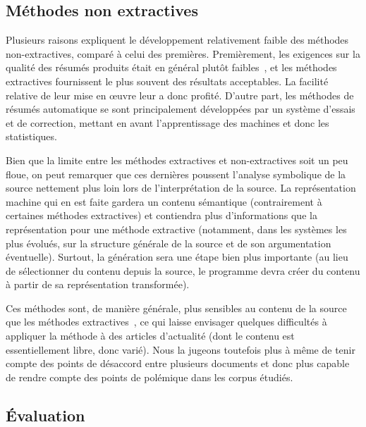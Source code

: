 \documentclass{article}           %
\begin{document}
\subsection{Méthodes non extractives}

Plusieurs raisons expliquent le développement relativement faible des méthodes non-extractives, comparé à celui des premières. Premièrement, les exigences sur la qualité des résumés produits était en général plutôt faibles~\cite{jones_automatic_2007}, et les méthodes extractives fournissent le plus souvent des résultats acceptables. La facilité relative de leur mise en œuvre leur a donc profité. D'autre part, les méthodes de résumés automatique se sont principalement développées par un système d'essais et de correction, mettant en avant l'apprentissage des machines et donc les statistiques.

Bien que la limite entre les méthodes extractives et non-extractives soit un peu floue, on peut remarquer que ces dernières poussent l'analyse symbolique de la source nettement plus loin lors de l'interprétation de la source. La représentation machine qui en est faite gardera un contenu sémantique (contrairement à certaines méthodes extractives) et contiendra plus d'informations que la représentation pour une méthode extractive (notamment, dans les systèmes les plus évolués, sur la structure générale de la source et de son argumentation éventuelle). Surtout, la génération sera une étape bien plus importante (au lieu de sélectionner du contenu depuis la source, le programme devra créer du contenu à partir de sa représentation transformée).

Ces méthodes sont, de manière générale, plus sensibles au contenu de la source que les méthodes extractives~\cite[p.1774]{jones_automatic_2007}, ce qui laisse envisager quelques difficultés à appliquer la méthode à des articles d'actualité (dont le contenu est essentiellement libre, donc varié). Nous la jugeons toutefois plus à même de tenir compte des points de désaccord entre plusieurs documents et donc plus capable de rendre compte des points de polémique dans les corpus étudiés.

\subsection{Évaluation}
\end{document}
